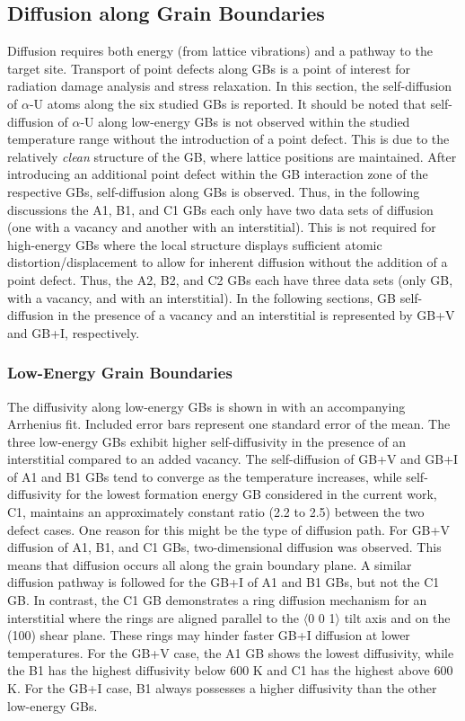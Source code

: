 \documentclass[review]{elsarticle}
\begin{document}
\subsection{Diffusion along Grain Boundaries}
Diffusion requires both energy (from lattice vibrations) and a pathway to the target site. Transport of point defects along GBs is a point of interest for radiation damage analysis and stress relaxation. In this section, the self-diffusion of $\alpha$-U atoms along the six studied GBs is reported. It should be noted that self-diffusion of $\alpha$-U along low-energy GBs is not observed within the studied temperature range without the introduction of a point defect. This is due to the relatively \textit{clean} structure of the GB, where lattice positions are maintained. After introducing an additional point defect within the GB interaction zone of the respective GBs, self-diffusion along GBs is observed. Thus, in the following discussions the A1, B1, and C1 GBs each only have two data sets of diffusion (one with a vacancy and another with an interstitial). This is not required for high-energy GBs where the local structure displays sufficient atomic distortion/displacement to allow for inherent diffusion without the addition of a point defect. Thus, the A2, B2, and C2 GBs each have three data sets (only GB, with a vacancy, and with an interstitial). In the following sections, GB self-diffusion in the presence of a vacancy and an interstitial is represented by GB+V and GB+I, respectively. 


\subsubsection{Low-Energy Grain Boundaries}

\par The diffusivity along low-energy GBs is shown in  with an accompanying Arrhenius fit. Included error bars represent one standard error of the mean. The three low-energy GBs exhibit higher self-diffusivity in the presence of an interstitial compared to an added vacancy. The self-diffusion of GB+V and GB+I of A1 and B1 GBs tend to converge as the temperature increases, while self-diffusivity for the lowest formation energy GB considered in the current work, C1, maintains an approximately constant ratio (2.2 to 2.5) between the two defect cases. One reason for this might be the type of diffusion path. For GB+V diffusion of A1, B1, and C1 GBs, two-dimensional diffusion was observed. This means that diffusion occurs all along the grain boundary plane. A similar diffusion pathway is followed for the GB+I of A1 and B1 GBs, but not the C1 GB. In contrast, the C1 GB demonstrates a ring diffusion mechanism for an interstitial where the rings are aligned parallel to the $\langle$0 0 1$\rangle$ tilt axis and on the (100) shear plane. These rings may hinder faster GB+I diffusion at lower temperatures. For the GB+V case, the A1 GB shows the lowest diffusivity, while the B1 has the highest diffusivity below 600 K and C1 has the highest above 600 K. For the GB+I case, B1 always possesses a higher diffusivity than the other low-energy GBs. 
\end{document}
